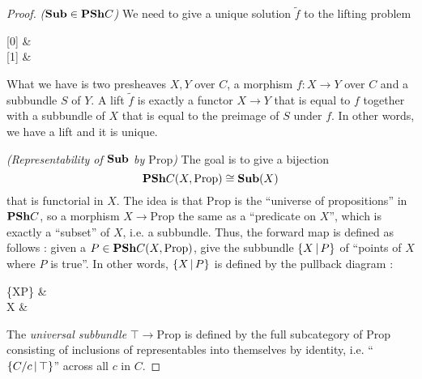 \documentclass{article}
\begin{document}
\begin{proof}
  \textit{($\mathbf{Sub} \in \mathbf{PSh} C$)}
  We need to give a unique solution $\tilde{f}$ to
  the lifting problem 
  \begin{cd}
    {[0]} & {} \\
    {[1]} & {}
    \arrow["1"', from=1-1, to=2-1]
    \arrow["f"', from=2-1, to=2-2]
    \arrow["t", from=1-2, to=2-2]
    \arrow[from=1-1, to=1-2]
    \arrow["{\tilde{f}}"', dashed, from=2-1, to=1-2]
  \end{cd}
  What we have is two presheaves $X, Y$ over $ C$,
  a morphism $f : X \to Y$ over $ C$ and 
  a subbundle $S$ of $Y$.
  A lift $\tilde{f}$ is exactly a functor $X \to Y$ that is equal to $f$
  together with a subbundle of $X$ that is equal to 
  the preimage of $S$ under $f$.
  In other words, we have a lift and it is unique.

  \textit{(Representability of $\mathbf{Sub}$ by $\mathrm{Prop}$)}
  The goal is to give a bijection 
  \[
    \mathbf{PSh} C(X,\mathrm{Prop}) \cong \mathbf{Sub}(X)  
  \]
  that is functorial in $X$.
  The idea is that $\mathrm{Prop}$ is the ``universe of propositions''
  in $\mathbf{PSh} C$,
  so a morphism $X \to \mathrm{Prop}$ the same as a ``predicate on $X$'',
  which is exactly a ``subset'' of $X$, i.e. a subbundle.
  Thus, the forward map is defined as follows : 
  given a $P \in \mathbf{PSh} C(X,\mathrm{Prop})$,
  give the subbundle $\left\{X\,|\, P\right\}$ of 
  ``points of $X$ where $P$ is true''.
  In other words, $\left\{X\,|\, P\right\}$ is defined by the pullback diagram : 
  \begin{cd}
    {\{X\vert P\}} & \top \\
	  X & {}
	  \arrow["P"', from=2-1, to=2-2]
	  \arrow[from=1-1, to=2-1]
	  \arrow[from=1-2, to=2-2]
	  \arrow[from=1-1, to=1-2]
	  \arrow["\lrcorner"{anchor=center, pos=0.125}, draw=none, from=1-1, to=2-2]
  \end{cd}
  The \emph{universal subbundle} $\top \to \mathrm{Prop}$
  is defined by the full subcategory of $\mathrm{Prop}$
  consisting of inclusions of representables into themselves by identity,
  i.e. ``$\left\{C / c \,|\, \top\right\}$'' across all $c$ in $ C$.
  

\end{proof}
\end{document}
